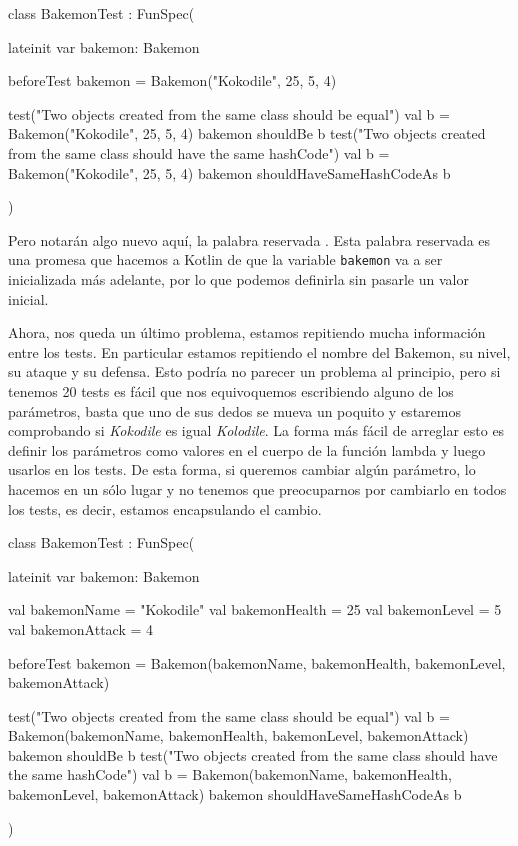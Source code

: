   \begin{kotlin}
    class BakemonTest : FunSpec({
      lateinit var bakemon: Bakemon

      beforeTest {
        bakemon = Bakemon("Kokodile", 25, 5, 4)
      }

      test("Two objects created from the same class should be equal") {
        val b = Bakemon("Kokodile", 25, 5, 4)
        bakemon shouldBe b
      }
      test("Two objects created from the same class should have the same hashCode") {
        val b = Bakemon("Kokodile", 25, 5, 4)
        bakemon shouldHaveSameHashCodeAs b
      }
    })
  \end{kotlin}

  Pero notarán algo nuevo aquí, la palabra reservada .
  Esta palabra reservada es una promesa que hacemos a Kotlin de que la variable \texttt{bakemon}
  va a ser inicializada más adelante, por lo que podemos definirla sin pasarle un valor inicial.

  Ahora, nos queda un último problema, estamos repitiendo mucha información entre los tests.
  En particular estamos repitiendo el nombre del Bakemon, su nivel, su ataque y su defensa.
  Esto podría no parecer un problema al principio, pero si tenemos 20 tests es fácil que nos 
  equivoquemos escribiendo alguno de los parámetros, basta que uno de sus dedos se mueva un poquito
  y estaremos comprobando si \textit{Kokodile} es igual \textit{Kolodile}.
  La forma más fácil de arreglar esto es definir los parámetros como valores en el cuerpo de la
  función lambda y luego usarlos en los tests.
  De esta forma, si queremos cambiar algún parámetro, lo hacemos en un sólo lugar y no tenemos
  que preocuparnos por cambiarlo en todos los tests, es decir, estamos encapsulando el cambio.

  \begin{kotlin}
    class BakemonTest : FunSpec({
      lateinit var bakemon: Bakemon

      val bakemonName = "Kokodile"
      val bakemonHealth = 25
      val bakemonLevel = 5
      val bakemonAttack = 4

      beforeTest {
        bakemon = Bakemon(bakemonName, bakemonHealth, bakemonLevel, bakemonAttack)
      }

      test("Two objects created from the same class should be equal") {
        val b = Bakemon(bakemonName, bakemonHealth, bakemonLevel, bakemonAttack)
        bakemon shouldBe b
      }
      test("Two objects created from the same class should have the same hashCode") {
        val b = Bakemon(bakemonName, bakemonHealth, bakemonLevel, bakemonAttack)
        bakemon shouldHaveSameHashCodeAs b
      }
    })
  \end{kotlin}


